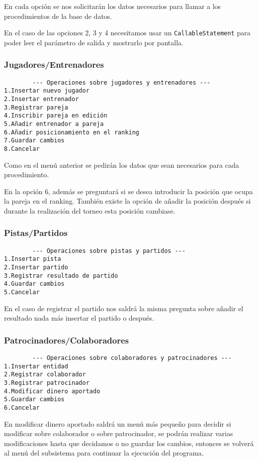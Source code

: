 En cada opción se nos solicitarán los datos necesarios para llamar a los
procedimientos de la base de datos.

En el caso de las opciones 2, 3 y 4 necesitamos usar un \texttt{CallableStatement}
para poder leer el parámetro de salida y mostrarlo por pantalla.

\subsubsection{Jugadores/Entrenadores}
\begin{lstlisting}
		--- Operaciones sobre jugadores y entrenadores ---
1.Insertar nuevo jugador
2.Insertar entrenador
3.Registrar pareja
4.Inscribir pareja en edición
5.Añadir entrenador a pareja
6.Añadir posicionamiento en el ranking
7.Guardar cambios
8.Cancelar
\end{lstlisting}

Como en el menú anterior se pedirán los datos que sean necesarios para cada
procedimiento.

En la opción 6, además se preguntará si se desea introducir la posición que ocupa
la pareja en el ranking. También existe la opción de añadir la posición después
si durante la realización del torneo esta posición cambiase.

\subsubsection{Pistas/Partidos}
\begin{lstlisting}
		--- Operaciones sobre pistas y partidos ---
1.Insertar pista
2.Insertar partido
3.Registrar resultado de partido
4.Guardar cambios
5.Cancelar
\end{lstlisting}

En el caso de registrar el partido nos saldrá la misma pregunta sobre añadir el
resultado nada más insertar el partido o después.

\subsubsection{Patrocinadores/Colaboradores}
\begin{lstlisting}
		--- Operaciones sobre colaboradores y patrocinadores ---
1.Insertar entidad
2.Registrar colaborador
3.Registrar patrocinador
4.Modificar dinero aportado
5.Guardar cambios
6.Cancelar
\end{lstlisting}

En modificar dinero aportado saldrá un menú más pequeño para decidir si modificar
sobre colaborador o sobre patrocinador, se podrán realizar varias modificaciones
hasta que decidamos o no guardar los cambios, entonces se volverá al menú del
subsistema para continuar la ejecución del programa.

